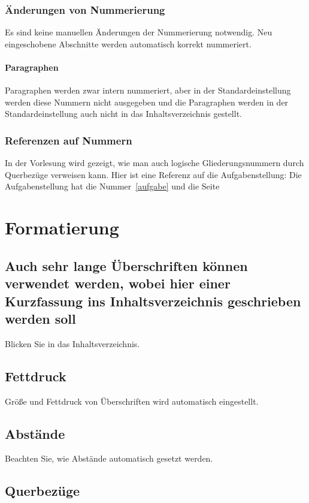 \documentclass[a4paper, 12pt]{article} %
\begin{document}
\subsubsection{Änderungen von Nummerierung}
Es sind keine manuellen Änderungen der Nummerierung notwendig. 
Neu eingeschobene Abschnitte werden automatisch korrekt nummeriert.

\paragraph{Paragraphen} Paragraphen werden zwar intern nummeriert, aber in der
Standardeinstellung werden diese Nummern nicht ausgegeben und die 
Paragraphen werden in der Standardeinstellung auch nicht in das 
Inhaltsverzeichnis gestellt.

\subsubsection{Referenzen auf Nummern}
In der Vorlesung wird gezeigt, wie man auch logische Gliederungsnummern 
durch Querbezüge verweisen kann. Hier ist eine Referenz auf die Aufgabenstellung:
Die Aufgabenstellung hat die Nummer~\ref{aufgabe} und die Seite~\pageref{aufgabe}

\section{Formatierung}
\subsection[Lange Überschriften]{Auch sehr lange Überschriften können verwendet werden, wobei hier
einer Kurzfassung ins Inhaltsverzeichnis geschrieben werden soll}
Blicken Sie in das Inhaltsverzeichnis.

\subsection{Fettdruck}
Größe und Fettdruck von Überschriften wird automatisch eingestellt.

\subsection{Abstände}
Beachten Sie, wie Abstände automatisch gesetzt werden.

\subsection{Querbezüge} \label{subsec:referenzen}
\end{document}
